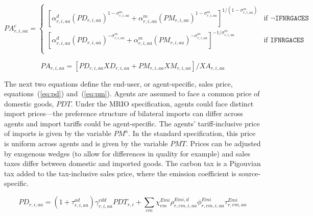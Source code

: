 \documentclass[11pt,letterpaper]{report}
\begin{document}
\begin{equation}
\label{eq:paac}
\mathit{PA}^c_{r,i,\mathit{aa}} =
\begin{cases}
\left[
   \alpha^{\mathit{d}}_{r,i,\mathit{aa}}
   \left( \mathit{PD}_{r,i,\mathit{aa}}
   \right)^{1-\sigma^{\mathit{m}}_{r,\mathit{i},\mathit{aa}}}
+  \alpha^{\mathit{m}}_{r,i,\mathit{aa}}
   \left( \mathit{PM}_{r,i,\mathit{aa}}
   \right)^{1-\sigma^{\mathit{m}}_{r,\mathit{i},\mathit{aa}}}
\right]^{1/(1-\sigma^{\mathit{m}}_{r,\mathit{i},\mathit{aa}})}
&    \textrm{if } \lnot \texttt{IFNRGACES} \\
\left[
   \alpha^{\mathit{d}}_{r,i,\mathit{aa}}
   \left( \mathit{PD}_{r,i,\mathit{aa}}
   \right)^{-\sigma^{\mathit{m}}_{r,\mathit{i},\mathit{aa}}}
+  \alpha^{\mathit{m}}_{r,i,\mathit{aa}}
   \left( \mathit{PM}_{r,i,\mathit{aa}}
   \right)^{-\sigma^{\mathit{m}}_{r,\mathit{i},\mathit{aa}}}
\right]^{-1/\sigma^{\mathit{m}}_{r,\mathit{i},\mathit{aa}}}
&    \textrm{if } \texttt{IFNRGACES} \\
\end{cases}
\end{equation}

\begin{equation}
\label{eq:paa}
\mathit{PA}_{r,i,\mathit{aa}} =
\left[
   \mathit{PD}_{r,i,\mathit{aa}} \mathit{XD}_{r,i,\mathit{aa}} +
   \mathit{PM}_{r,i,\mathit{aa}} \mathit{XM}_{r,i,\mathit{aa}}
\right] \bigg / \mathit{XA}_{r,i,aa}
\end{equation}

The next two equations define the end-user, or agent-specific, sales price,
equations~(\ref{eq:pd}) and~(\ref{eq:pm}). Agents are assumed to face a common
price of domestic goods, $\mathit{PDT}$. Under the MRIO specification, agents
could face distinct import prices---the preference structure of bilateral
imports can differ across agents and import tariffs could be agent-specific.
The agents' tariff-inclusive price of imports is given by the variable
$\mathit{PM}^a$. In the standard specification, this price is uniform across
agents and is given by the variable $\mathit{PMT}$. Prices can be adjusted by
exogenous wedges (to allow for differences in quality for example) and sales
taxes differ between domestic and imported goods. The carbon tax is a Pigouvian
tax added to the tax-inclusive sales price, where the emission coefficient is
source-specific.

\begin{equation}
\label{eq:pd}
\mathit{PD}_{r,i,aa} =
   \left( 1 + \tau^{\mathit{ad}}_{r,i,\mathit{aa}} \right)
   \gamma^{\mathit{edd}}_{r,i,\mathit{aa}} \mathit{PDT}_{r,i}
+  \sum_{\mathit{em}} {
      \chi^{\mathit{Emi}}_{\mathit{em}}
      \rho^{\mathit{Emi},d}_{r,\mathit{em},i,\mathit{aa}}
      \phi^{\mathit{Emi}}_{r,\mathit{em},i,\mathit{aa}}
      \tau^{\mathit{Emi}}_{r,\mathit{em},\mathit{aa}}
   }
\end{equation}
\end{document}
